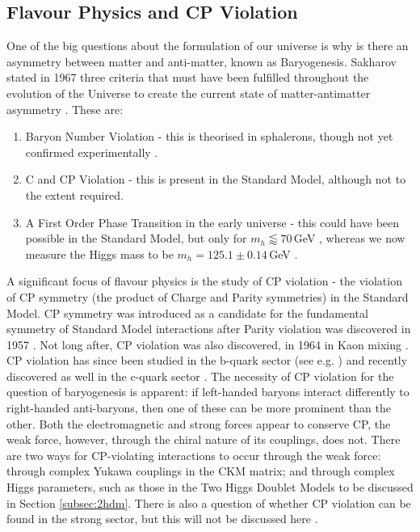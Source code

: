 \documentclass[a4paper,12pt]{article}
\begin{document}
\subsection{Flavour Physics and CP Violation}
\label{subsec:flavobs}
One of the big questions about the formulation of our universe is why is there an asymmetry between matter and anti-matter, known as Baryogenesis. 
Sakharov stated in 1967 three criteria that must have been fulfilled throughout the evolution of the Universe to create the current state of matter-antimatter asymmetry \cite{sak}. 
These are:
\begin{enumerate}
    \item Baryon Number Violation - this is theorised in sphalerons, though not yet confirmed experimentally \cite{sphal}. 
    \item C and CP Violation - this is present in the Standard Model, although not to the extent required. 
    \item A First Order Phase Transition in the early universe - this could have been possible in the Standard Model, but only for $m_h\lessapprox70\,$GeV \cite{phase}, whereas we now measure the Higgs mass to be $m_h=125.1\pm0.14\,$GeV \cite{pdg}.
\end{enumerate}
A significant focus of flavour physics is the study of CP violation - the violation of CP symmetry (the product of Charge and Parity symmetries) in the Standard Model.
CP symmetry was introduced as a candidate for the fundamental symmetry of Standard Model interactions after Parity violation was discovered in 1957 \cite{wu}.
Not long after, CP violation was also discovered, in 1964 in Kaon mixing \cite{cpv}.
CP violation has since been studied in the b-quark sector (see e.g. \cite{mix15}) and recently discovered as well in the c-quark sector \cite{charmcp}. 
The necessity of CP violation for the question of baryogenesis is apparent: if left-handed baryons interact differently to right-handed anti-baryons, then one of these can be more prominent than the other. 
Both the electromagnetic and strong forces appear to conserve CP, the weak force, however, through the chiral nature of its couplings, does not.
There are two ways for CP-violating interactions to occur through the weak force: through complex Yukawa couplings in the CKM matrix; and through complex Higgs parameters, such as those in the Two Higgs Doublet Models to be discussed in Section \ref{subsec:2hdm}.
There is also a question of whether CP violation can be found in the strong sector, but this will not be discussed here \cite{kane}.
\end{document}
